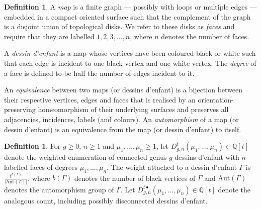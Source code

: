 \documentclass[a4paper]{article}
\theoremstyle{plain}
\numberwithin{theorem}{section}
\theoremstyle{definition}
\newtheorem{definition}[theorem]{Definition}
\theoremstyle{remark}
\renewcommand{\geq}{\geqslant}
\begin{document}
\begin{definition} A {\em map} is a finite graph --- possibly with loops or multiple edges --- embedded in a compact oriented surface such that the complement of the graph is a disjoint union of topological disks. We refer to these disks as {\em faces} and require that they are labelled $1, 2, 3, \ldots, n$, where $n$ denotes the number of faces.


A {\em dessin d'enfant} is a map whose vertices have been coloured black or white such that each edge is incident to one black vertex and one white vertex. The {\em degree} of a face is defined to be half the number of edges incident to it.


An {\em equivalence} between two maps (or dessins d'enfant) is a bijection between their respective vertices, edges and faces that is realised by an orientation-preserving homeomorphism of their underlying surfaces and preserves all adjacencies, incidences, labels (and colours). An {\em automorphism} of a map (or dessin d'enfant) is an equivalence from the map (or dessin d'enfant) to itself.
\end{definition}


\begin{definition} \label{def:dessincount}
For $g \geq 0$, $n \geq 1$ and $\mu_1, \ldots, \mu_n \geq 1$, let $D^t_{g,n}(\mu_1, \ldots, \mu_n) \in \mathbb{Q}[t]$ denote the weighted enumeration of connected genus $g$ dessins d'enfant with $n$ labelled faces of degrees $\mu_1, \ldots, \mu_n$. The weight attached to a dessin d'enfant $\Gamma$ is $\frac{t^{b(\Gamma)}}{|\mathrm{Aut}(\Gamma)|}$, where $b(\Gamma)$ denotes the number of black vertices of $\Gamma$ and $\mathrm{Aut}(\Gamma)$ denotes the automorphism group of $\Gamma$. Let $D^{t\bullet}_{g,n}(\mu_1, \ldots, \mu_n) \in \mathbb{Q}[t]$ denote the analogous count, including possibly disconnected dessins d'enfant.
\end{definition}
\end{document}

